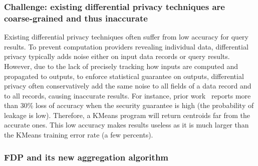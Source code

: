 \vspace{-.15in}
\subsubsection{Challenge: existing differential privacy techniques are 
coarse-grained and thus inaccurate} 
\label{sec:obj2-problem}\vspace{-.075in}

Existing differential privacy techniques often suffer from low accuracy for 
query results. To prevent computation providers revealing individual 
data, differential privacy typically adds noise either on input data 
records or query results. However, due to the lack of precisely tracking 
how inputs are computed and propagated to outputs, to enforce statistical 
guarantee on outputs, differential privacy often conservatively add the same 
noise to all fields of a data record and to all records, causing inaccurate 
results. For instance, prior work~\cite{differentialresult:vldb15} reports 
more than 30\% loss of accuracy when the security guarantee is high (the 
probability of leakage is low). Therefore, a KMeans program will return 
centroids far from the accurate ones. This low accuracy makes results useless as 
it is much larger than the KMeans training error rate (a few percents).

\vspace{-.15in}
\subsubsection{FDP and its new aggregation algorithm} 
\label{sec:fdp}\vspace{-.075in}

